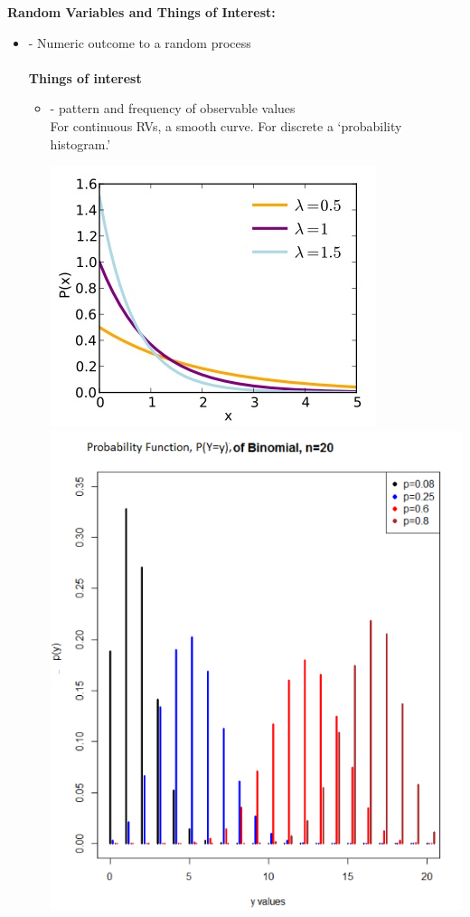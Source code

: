 \Large \noindent \textbf{Random Variables and Things of Interest:}\large\\
\begin{itemize}
\item 
\underbar{~~~~~~~~~~~~~~~~~~~~~~~~~~~~~~~~~~~~~~}
- Numeric outcome to a random process\\~\\
\textbf{Things of interest}\\
\begin{itemize}
\item 
\underbar{~~~~~~~~~~~~~~~~~~~~~~~~~~~~~~~~~~~~~~}
- pattern and frequency of observable values\\
For continuous RVs, a smooth curve.  For discrete a `probability histogram.'
\begin{center}
\includegraphics[scale=0.75]{Exponential_pdf}\includegraphics[scale=0.4]{binomialpmf}

\end{center}
\end{itemize}
\end{itemize}
